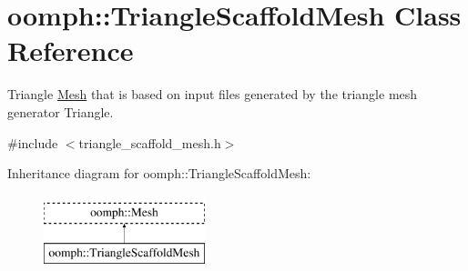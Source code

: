 \hypertarget{classoomph_1_1TriangleScaffoldMesh}{}\section{oomph\+:\+:Triangle\+Scaffold\+Mesh Class Reference}
\label{classoomph_1_1TriangleScaffoldMesh}


Triangle \hyperlink{classoomph_1_1Mesh}{Mesh} that is based on input files generated by the triangle mesh generator Triangle.  




{\ttfamily \#include $<$triangle\+\_\+scaffold\+\_\+mesh.\+h$>$}

Inheritance diagram for oomph\+:\+:Triangle\+Scaffold\+Mesh\+:\begin{figure}[H]
\begin{center}
\leavevmode
\includegraphics[height=2.000000cm]{classoomph_1_1TriangleScaffoldMesh}
\end{center}
\end{figure}
